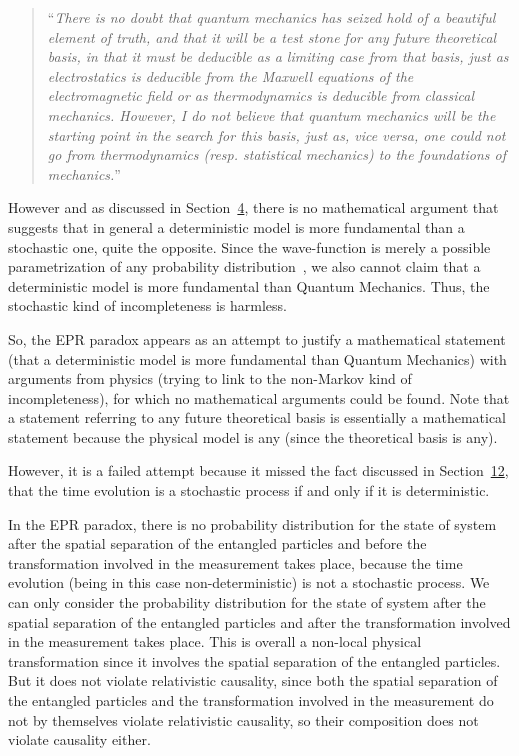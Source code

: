 \documentclass[11pt]{book}
\begin{document}
\begin{quote}
``\emph{There is no doubt that quantum mechanics has seized hold of a
beautiful element of truth, and that it will be a test stone for any
future theoretical basis, in that it must be deducible as a limiting
case from that basis, just as electrostatics is deducible from the
Maxwell equations of the electromagnetic field or as thermodynamics is
deducible from classical mechanics. However, I do not believe that
quantum mechanics will be the starting point in the search for this
basis, just as, vice versa, one could not go from thermodynamics (resp.
statistical mechanics) to the foundations of mechanics.}''
\end{quote}

However and as discussed in
Section~\protect\hyperlink{sec:deterministic}{4}, there is no
mathematical argument that suggests that in general a deterministic
model is more fundamental than a stochastic one, quite the opposite.
Since the wave-function is merely a possible parametrization of any
probability distribution~\cite{Pedro2017Relating}, we also cannot claim that a deterministic model is more
fundamental than Quantum Mechanics. Thus, the stochastic kind of
incompleteness is harmless.

So, the EPR paradox appears as an attempt to justify a mathematical
statement (that a deterministic model is more fundamental than Quantum
Mechanics) with arguments from physics (trying to link to the non-Markov
kind of incompleteness), for which no mathematical arguments could be
found. Note that a statement referring to any future theoretical basis
is essentially a mathematical statement because the physical model is
any (since the theoretical basis is any).

However, it is a failed attempt because it missed the fact discussed in
Section~\protect\hyperlink{sec:timetranslation}{12}, that the time
evolution is a stochastic process if and only if it is deterministic.

In the EPR paradox, there is no probability distribution for the state
of system after the spatial separation of the entangled particles and
before the transformation involved in the measurement takes place,
because the time evolution (being in this case non-deterministic) is not
a stochastic process. We can only consider the probability distribution
for the state of system after the spatial separation of the entangled
particles and after the transformation involved in the measurement takes
place. This is overall a non-local physical transformation since it
involves the spatial separation of the entangled particles. But it does
not violate relativistic causality, since both the spatial separation of
the entangled particles and the transformation involved in the
measurement do not by themselves violate relativistic causality, so
their composition does not violate causality either.
\end{document}
